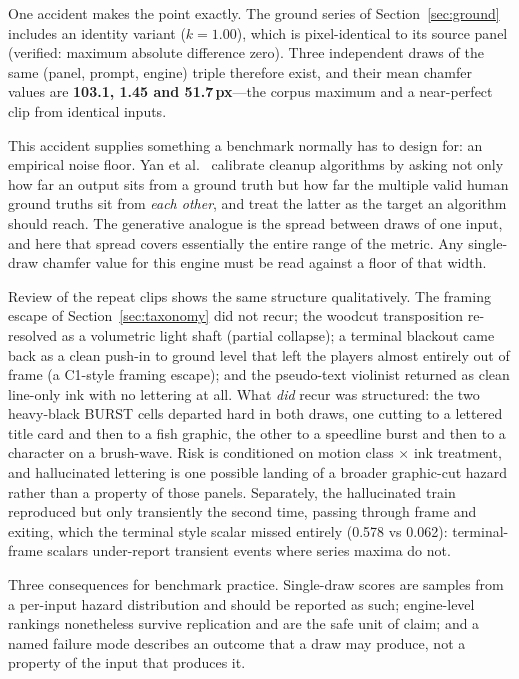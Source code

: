 \documentclass[11pt]{article}
\begin{document}
One accident makes the point exactly. The ground series of
Section~\ref{sec:ground} includes an identity variant ($k=1.00$), which is
pixel-identical to its source panel (verified: maximum absolute difference
zero). Three independent draws of the same (panel, prompt, engine) triple
therefore exist, and their mean chamfer values are \textbf{103.1, 1.45 and
51.7\,px}---the corpus maximum and a near-perfect clip from identical
inputs.

This accident supplies something a benchmark normally has to design for: an
empirical noise floor. Yan et al.~\cite{yan2020cleanup} calibrate cleanup
algorithms by asking not only how far an output sits from a ground truth but
how far the multiple valid human ground truths sit from \emph{each other},
and treat the latter as the target an algorithm should reach. The generative
analogue is the spread between draws of one input, and here that spread
covers essentially the entire range of the metric. Any single-draw chamfer
value for this engine must be read against a floor of that width.

Review of the repeat clips shows the same structure qualitatively. The framing escape of
Section~\ref{sec:taxonomy} did not recur; the woodcut transposition
re-resolved as a volumetric light shaft (partial collapse); a terminal
blackout came back as a clean push-in to ground level that left the players almost entirely out of frame (a C1-style framing escape); and the pseudo-text violinist returned
as clean line-only ink with no lettering at all. What \emph{did} recur was
structured: the two heavy-black BURST cells departed hard in both draws,
one cutting to a lettered title card and then to a fish graphic, the other
to a speedline burst and then to a character on a brush-wave. Risk is
conditioned on motion class $\times$ ink treatment, and hallucinated
lettering is one possible landing of a broader graphic-cut hazard rather
than a property of those panels. Separately, the hallucinated train
reproduced but only transiently the second time, passing through frame and
exiting, which the terminal style scalar missed entirely (0.578 vs 0.062):
terminal-frame scalars under-report transient events where series maxima do
not.

Three consequences for benchmark practice. Single-draw scores are samples
from a per-input hazard distribution and should be reported as such;
engine-level rankings nonetheless survive replication and are the safe unit
of claim; and a named failure mode describes an outcome that a draw may
produce, not a property of the input that produces it.
\end{document}
